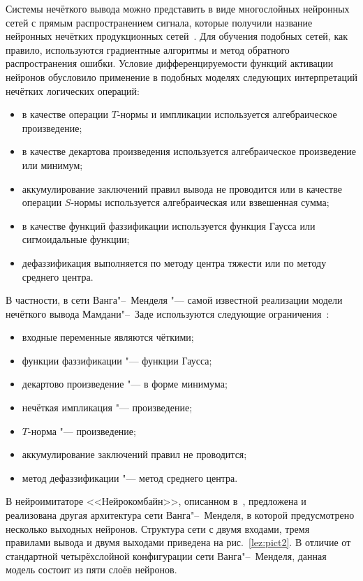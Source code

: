 Системы нечёткого вывода можно представить в виде многослойных нейронных
сетей с прямым распространением сигнала, которые получили название нейронных
нечётких продукционных сетей~\cite{soldat:bib5}. Для обучения подобных сетей, как правило,
используются градиентные алгоритмы и метод обратного распространения ошибки.
Условие дифференцируемости функций активации нейронов обусловило применение
в подобных моделях следующих интерпретаций нечётких логических операций:

\begin{itemize}
\item в качестве операции $T$-нормы и импликации используется алгебраическое произведение;
\item в качестве декартова произведения используется алгебраическое произведение или минимум;
\item аккумулирование заключений правил вывода не проводится или в качестве операции $S$-нормы используется алгебраическая или взвешенная сумма;
\item в качестве функций фаззификации используется функция Гаусса или сигмоидальные функции;
\item дефаззификация выполняется по методу центра тяжести или по методу среднего центра.
\end{itemize}

В частности, в сети Ванга"--~Менделя "--- самой известной реализации модели
нечёткого вывода Мамдани"--~Заде используются следующие ограничения~\cite{soldat:bib5}:
\begin{itemize}
\item входные переменные являются чёткими;
\item функции фаззификации "--- функции Гаусса;
\item декартово произведение "--- в форме минимума;
\item нечёткая импликация "--- произведение;
\item $T$-норма "--- произведение;
\item аккумулирование заключений правил не проводится;
\item метод дефаззификации "--- метод среднего центра.
\end{itemize}

В нейроимитаторе <<Нейрокомбайн>>, описанном в~\cite{soldat:bib2}, предложена и реализована
другая архитектура сети Ванга"--~Менделя, в которой предусмотрено несколько
выходных нейронов. Структура сети с двумя входами, тремя правилами вывода и
двумя выходами приведена на рис.~\ref{lez:pict2}. В отличие от стандартной
четырёхслойной конфигурации сети Ванга"--~Менделя, данная модель состоит из
пяти слоёв нейронов.

